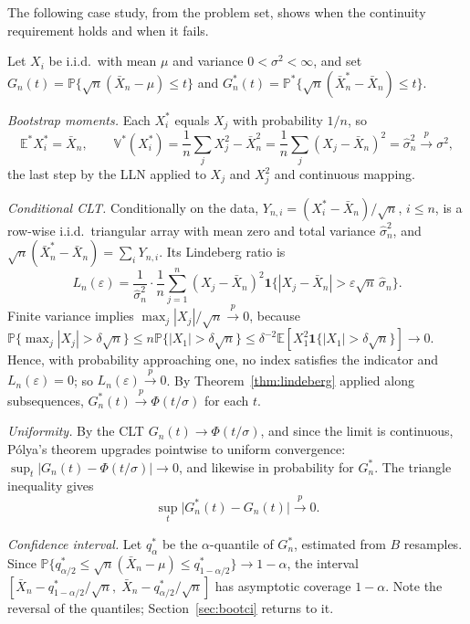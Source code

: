 \documentclass[11pt,a4paper]{article}
\newcommand{\E}{\mathbb{E}}
\newcommand{\V}{\mathbb{V}}
\renewcommand{\P}{\mathbb{P}}
\newcommand{\cp}{\xrightarrow{\;p\;}}
\newcommand{\iid}{i.i.d.}
\newcommand{\one}{\mathbf 1}
\newcommand{\Xbar}{\bar X_n}
\newcommand{\Pstar}{\P^{*}}
\newcommand{\Estar}{\E^{*}}
\newcommand{\Vstar}{\V^{*}}
\begin{document}
The following case study, from the problem set, shows when the continuity requirement holds and when it fails.

\begin{example}\label{ex:bootmean}
Let $X_i$ be \iid\ with mean $\mu$ and variance $0<\sigma^2<\infty$, and set $G_n(t)=\P\{\sqrt n(\Xbar-\mu)\le t\}$ and $G_n^*(t)=\Pstar\{\sqrt n(\bar X_n^*-\Xbar)\le t\}$.

\emph{Bootstrap moments.} Each $X_i^*$ equals $X_j$ with probability $1/n$, so
\[
\Estar X_i^*=\Xbar,\qquad\Vstar(X_i^*)=\frac1n\sum_jX_j^2-\Xbar^2=\frac1n\sum_j(X_j-\Xbar)^2=\hat\sigma_n^2\cp\sigma^2,
\]
the last step by the LLN applied to $X_j$ and $X_j^2$ and continuous mapping.

\emph{Conditional CLT.} Conditionally on the data, $Y_{n,i}=(X_i^*-\Xbar)/\sqrt n$, $i\le n$, is a row-wise \iid\ triangular array with mean zero and total variance $\hat\sigma_n^2$, and $\sqrt n(\bar X_n^*-\Xbar)=\sum_iY_{n,i}$. Its Lindeberg ratio is
\[
L_n(\varepsilon)=\frac{1}{\hat\sigma_n^2}\cdot\frac1n\sum_{j=1}^n(X_j-\Xbar)^2\one\big\{|X_j-\Xbar|>\varepsilon\sqrt n\,\hat\sigma_n\big\}.
\]
Finite variance implies $\max_j|X_j|/\sqrt n\cp0$, because $\P\{\max_j|X_j|>\delta\sqrt n\}\le n\P\{|X_1|>\delta\sqrt n\}\le\delta^{-2}\E[X_1^2\one\{|X_1|>\delta\sqrt n\}]\to0$. Hence, with probability approaching one, no index satisfies the indicator and $L_n(\varepsilon)=0$; so $L_n(\varepsilon)\cp0$. By Theorem~\ref{thm:lindeberg} applied along subsequences, $G_n^*(t)\cp\Phi(t/\sigma)$ for each $t$.

\emph{Uniformity.} By the CLT $G_n(t)\to\Phi(t/\sigma)$, and since the limit is continuous, P\'olya's theorem upgrades pointwise to uniform convergence: $\sup_t|G_n(t)-\Phi(t/\sigma)|\to0$, and likewise in probability for $G_n^*$. The triangle inequality gives
\[
\sup_t\big|G_n^*(t)-G_n(t)\big|\cp0 .
\]

\emph{Confidence interval.} Let $q^*_\alpha$ be the $\alpha$-quantile of $G_n^*$, estimated from $B$ resamples. Since $\P\{q^*_{\alpha/2}\le\sqrt n(\Xbar-\mu)\le q^*_{1-\alpha/2}\}\to1-\alpha$, the interval $[\Xbar-q^*_{1-\alpha/2}/\sqrt n,\;\Xbar-q^*_{\alpha/2}/\sqrt n]$ has asymptotic coverage $1-\alpha$. Note the reversal of the quantiles; Section~\ref{sec:bootci} returns to it.
\end{example}
\end{document}

